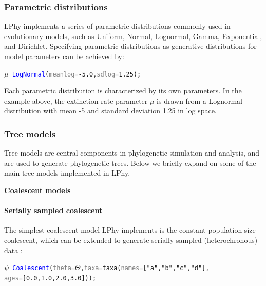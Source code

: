 \documentclass[10pt,letterpaper,table]{article}
\theoremstyle{definition}
\begin{document}
\subsubsection{Parametric distributions}
LPhy implements a series of parametric distributions commonly used in evolutionary models, such as Uniform, Normal, Lognormal, Gamma, Exponential, and Dirichlet. 
Specifying parametric distributions as generative distributions for model parameters can be achieved by:

{\small
\begin{alltt}
    \textcolor{bluishgreen}{\(\mu\)} ~ \textcolor{blue}{LogNormal}(\textcolor{gray}{meanlog=}\textcolor{constant}{-5.0}, \textcolor{gray}{sdlog=}\textcolor{constant}{1.25});
\end{alltt}}

Each parametric distribution is characterized by its own parameters. 
In the example above, the extinction rate parameter $\mu$ is drawn from a Lognormal distribution with mean -5 and standard deviation 1.25 in log space.

\subsubsection{Tree models}
\label{sec:treeprior}
Tree models are central components in phylogenetic simulation and analysis, and are used to generate phylogenetic trees. Below we briefly expand on some of the main tree models implemented in LPhy.
\newline

\noindent \textbf{Coalescent models}
\paragraph{Serially sampled coalescent}
The simplest coalescent model LPhy implements is the constant-population size coalescent, which can be extended to generate serially sampled (heterochronous) data \cite{Rodrigo1999SerialCoalescent}:
{\small
  \begin{alltt}
    \textcolor{bluishgreen}{\(\psi\)} ~ \textcolor{blue}{Coalescent}(\textcolor{gray}{theta=}\textcolor{bluishgreen}{\(\Theta\)}, \textcolor{gray}{taxa=}\textcolor{generator}{taxa}(\textcolor{gray}{names=}[\textcolor{constant}{"a"}, \textcolor{constant}{"b"}, \textcolor{constant}{"c"}, \textcolor{constant}{"d"}], 
      \textcolor{gray}{ages=}[\textcolor{constant}{0.0}, \textcolor{constant}{1.0}, \textcolor{constant}{2.0}, \textcolor{constant}{3.0}]));
  \end{alltt}
}
\end{document}
